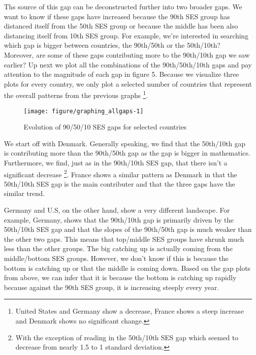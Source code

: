 \documentclass[11pt, a4paper]{article}\usepackage[]{graphicx}\usepackage[]{color}
\begin{document}
Ths source of this gap can be deconstructed further into two broader gaps. We want to know if these gaps have increased because the 90th SES group has distanced itself from the 50th SES group or because the middle has been also distancing itself from 10th SES group. For example, we're interested in searching which gap is bigger between countries, the 90th/50th or the 50th/10th? Moreover, are some of these gaps contributing more to the 90th/10th gap we saw earlier? Up next we plot all the combinations of the 90th/50th/10th gaps and pay attention to the magnitude of each gap in figure 5. Because we visualize three plots for every country, we only plot a selected number of countries that represent the overall patterns from the previous graphs \footnote{United States and Germany show a decrease, France shows a steep increase and Denmark shows no significant change.}.

\begin{figure}
\begin{center}


{\centering \texttt{[image: figure/graphing\_allgaps-1]} 

}



\caption{Evolution of 90/50/10 SES gaps for selected countries}
\end{center}
\end{figure}

We start off with Denmark. Generally speaking, we find that the 50th/10th gap is contributing more than the 90th/50th gap as the gap is bigger in mathematics. Furthermore, we find, just as in the 90th/10th SES gap, that there isn't a significant decrease \footnote{With the exception of reading in the 50th/10th SES gap which seemed to decrease from nearly 1.5 to 1 standard deviation.}. France shows a similar pattern as Denmark in that the 50th/10th SES gap is the main contributer and that the three gaps have the similar trend. 

Germany and U.S, on the other hand, show a very different landscape. For example, Germany, shows that the 90th/10th gap is primarily driven by the 50th/10th SES gap and that the slopes of the 90th/50th gap is much weaker than the other two gaps. This means that top/middle SES groups have shrunk much less than the other groups. The big catching up is actually coming from the middle/bottom SES groups. However, we don't know if this is because the bottom is catching up or that the middle is coming down. Based on the gap plots from above, we can infer that it is because the bottom is catching up rapidly because against the 90th SES group, it is increasing steeply every year.
\end{document}
